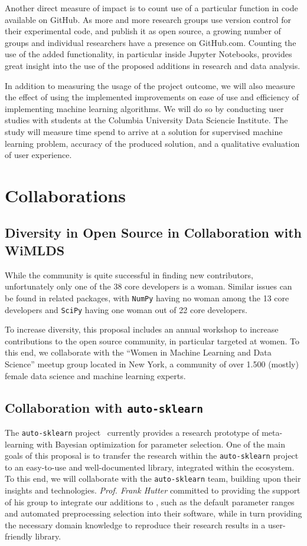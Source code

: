 Another direct measure of impact is to count use of a particular function in
code available on GitHub. As more and more research groups use version
control for their experimental code, and publish it as open source, a growing
number of groups and individual researchers have a presence on GitHub.com.
Counting the use of the added functionality, in particular inside Jupyter
Notebooks, provides great insight into the use of the proposed additions in
research and data analysis.

In addition to measuring the usage of the project outcome, we will also measure
the effect of using the implemented improvements on ease of use and efficiency
of implementing machine learning algorithms.
We will do so by conducting user studies with students at the Columbia University
Data Sciencie Institute. The study will measure time spend to arrive at a solution
for supervised machine learning problem, accuracy of the produced solution,
and a qualitative evaluation of user experience.


\section{Collaborations}
\subsection{Diversity in Open Source in Collaboration with WiMLDS}
While the \sklearn{} community is quite successful in finding new contributors,
unfortunately only one of the 38 \sklearn{} core developers is a woman.
Similar issues can be found in related packages, with \texttt{NumPy} having no
woman among the 13 core developers and \texttt{SciPy} having one woman out of
22 core developers.

To increase diversity, this proposal includes an annual workshop to increase
contributions to the open source community, in particular targeted at women.
To this end, we collaborate with the ``Women in Machine Learning and Data Science''
meetup group located in New York, a community of over 1.500 (mostly) female data science and
machine learning experts.

\subsection{Collaboration with \texttt{auto-sklearn}}
The \texttt{auto-sklearn} project~\autocite{feurer-nips2015} currently provides
a research prototype of meta-learning with Bayesian optimization for parameter
selection. One of the main goals of this proposal is to transfer the research
within the \texttt{auto-sklearn} project to an easy-to-use and well-documented
library, integrated within the \sklearn{} ecosystem. To this end, we will
collaborate with the \texttt{auto-sklearn} team, building upon their insights
and technologies. \emph{Prof. Frank Hutter} committed to providing the support of his group
to integrate our additions to \sklearn{}, such as the default parameter ranges
and automated preprocessing selection into their software, while in turn
providing the necessary domain knowledge to reproduce their research results in
a user-friendly library.

